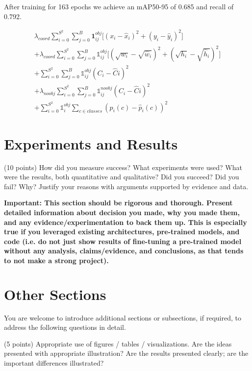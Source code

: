 \documentclass[10pt,twocolumn,letterpaper]{article}
\begin{document}
After training for 163 epochs we achieve an mAP50-95 of 0.685 and recall of 0.792.

\begin{multline}
\lambda_{coord}\sum_{i=0}^{S^2}\sum_{j=0}^{B}\mathbf{1}_{ij}^{obj}\Big[(x_i-\hat{x}_i)^2+(y_i-\hat{y}_i)^2\Big] \\ + \lambda_{coord}\sum_{i=0}^{S^2}\sum_{j=0}^{B}\mathds{1}_{ij}^{obj}\Big[(\sqrt{w_i}-\sqrt{\hat{w}_i})^2+(\sqrt{h_i}-\sqrt{\hat{h}_i})^2\Big]\\
+\sum_{i=0}^{S^2}\sum_{j=0}^{B}\mathds{1}_{ij}^{obj}(C_i-\hat{C}i)^2\\
+\lambda_{noobj}\sum_{i=0}^{S^2}\sum_{j=0}^{B}\mathds{1}_{ij}^{noobj}(C_i-\hat{C}i)^2\\
+\sum_{i=0}^{S^2}\mathds{1}_{i}^{obj}\sum_{c\in classes}(p_i(c)-\hat{p}_i(c))^2
\end{multline}


\section{Experiments and Results}

(10 points) How did you measure success? What experiments were used? What were the results, both quantitative and qualitative? Did you succeed? Did you fail? Why? Justify your reasons with arguments supported by evidence and data.

\textbf{Important: This section should be rigorous and thorough. Present detailed information about decision you made, why you made them, and any evidence/experimentation to back them up. This is especially true if you leveraged existing architectures, pre-trained models, and code (i.e. do not just show results of fine-tuning a pre-trained model without any analysis, claims/evidence, and conclusions, as that tends to not make a strong project). }

\section{Other Sections}


You are welcome to introduce additional sections or subsections, if required, to address the following questions in detail. 

(5 points) Appropriate use of figures / tables / visualizations. Are the ideas presented with appropriate illustration? Are the results presented clearly; are the important differences illustrated? 
\end{document}
